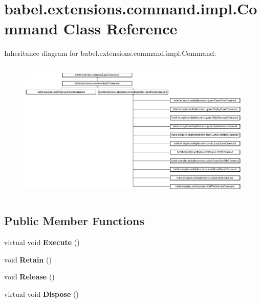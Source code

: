 \hypertarget{classbabel_1_1extensions_1_1command_1_1impl_1_1_command}{\section{babel.\-extensions.\-command.\-impl.\-Command Class Reference}
\label{classbabel_1_1extensions_1_1command_1_1impl_1_1_command}
}
Inheritance diagram for babel.\-extensions.\-command.\-impl.\-Command\-:\begin{figure}[H]
\begin{center}
\leavevmode
\includegraphics[height=6.735395cm]{classbabel_1_1extensions_1_1command_1_1impl_1_1_command}
\end{center}
\end{figure}
\subsection*{Public Member Functions}
\begin{DoxyCompactItemize}
\item 
\hypertarget{classbabel_1_1extensions_1_1command_1_1impl_1_1_command_a18329c34d3b0815f1196c4d68fce90e8}{virtual void {\bfseries Execute} ()}\label{classbabel_1_1extensions_1_1command_1_1impl_1_1_command_a18329c34d3b0815f1196c4d68fce90e8}

\item 
\hypertarget{classbabel_1_1extensions_1_1command_1_1impl_1_1_command_aa90a93a40f905804f3ada35ff0aab064}{void {\bfseries Retain} ()}\label{classbabel_1_1extensions_1_1command_1_1impl_1_1_command_aa90a93a40f905804f3ada35ff0aab064}

\item 
\hypertarget{classbabel_1_1extensions_1_1command_1_1impl_1_1_command_a66863c2282a97a3c4b6863bce595485f}{void {\bfseries Release} ()}\label{classbabel_1_1extensions_1_1command_1_1impl_1_1_command_a66863c2282a97a3c4b6863bce595485f}

\item 
\hypertarget{classbabel_1_1extensions_1_1command_1_1impl_1_1_command_aab75ab7a182f404a4d399d38876dbbaa}{virtual void {\bfseries Dispose} ()}\label{classbabel_1_1extensions_1_1command_1_1impl_1_1_command_aab75ab7a182f404a4d399d38876dbbaa}

\end{DoxyCompactItemize}
